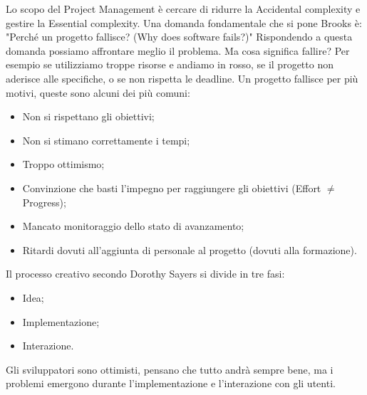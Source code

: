 Lo scopo del Project Management è cercare di ridurre la Accidental complexity e gestire la Essential complexity.\newline
Una domanda fondamentale che si pone Brooks è: "Perché un progetto fallisce? (Why does software fails?)"\newline
Rispondendo a questa domanda possiamo affrontare meglio il problema. Ma cosa significa fallire? Per esempio se utilizziamo troppe risorse e andiamo in rosso, se il progetto non aderisce alle specifiche, o se non rispetta le deadline.\newline
Un progetto fallisce per più motivi, queste sono alcuni dei più comuni:
\begin{itemize}
	\item Non si rispettano gli obiettivi;
	\item Non si stimano correttamente i tempi;
	\item Troppo ottimismo;
	\item Convinzione che basti l'impegno per raggiungere gli obiettivi (Effort $\neq$ Progress);
	\item Mancato monitoraggio dello stato di avanzamento;
	\item Ritardi dovuti all'aggiunta di personale al progetto (dovuti alla formazione).
\end{itemize}
Il processo creativo secondo Dorothy Sayers si divide in tre fasi:
\begin{itemize}
	\item Idea;
	\item Implementazione;
	\item Interazione.
\end{itemize}
Gli sviluppatori sono ottimisti, pensano che tutto andrà sempre bene, ma i problemi emergono durante  l'implementazione e l'interazione con gli utenti.
